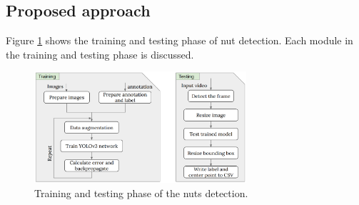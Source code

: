 \documentclass[journal,onecolumn,12pt]{IEEEtran}
\begin{document}
\subsection{Proposed approach}
Figure \ref{fig:TTphase} shows the training and testing phase of nut detection. Each module in the training and testing phase is discussed.  
\begin{figure}[h]
	\centering
	\includegraphics[width=0.7\textwidth]{images/TTphase.png}
	\caption{Training and testing phase of the nuts detection.}
	\label{fig:TTphase}
\end{figure}
\end{document}
